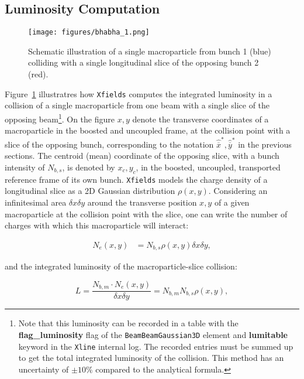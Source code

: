 \subsection{Luminosity Computation} 

\begin{figure}[h]
	\centering
	\texttt{[image: figures/bhabha\_1.png]}
	\caption{\small Schematic illustration of a single macroparticle from bunch 1 (blue) colliding with a single longitudinal slice of the opposing bunch 2 (red).  \label{fig:bhabha_1}}
\end{figure}

Figure~\ref{fig:bhabha_1} illustratres how \texttt{Xfields} computes the integrated luminosity in a collision of a single macroparticle from one beam with a single slice of the opposing beam\footnote{Note that this luminosity can be recorded in a table with the \textbf{flag\_luminosity} flag of the \texttt{BeamBeamGaussian3D} element and \textbf{lumitable} keyword in the \texttt{Xline} internal log. The recorded entries must be summed up to get the total integrated luminosity of the collision. This method has an uncertainty of $\pm10\%$ compared to the analytical formula.}. On the figure $x,y$ denote the transverse coordinates of a macroparticle in the boosted and uncoupled frame, at the collision point with a slice of the opposing bunch, corresponding to the notation $\hat{\overline{x}}^*, \hat{\overline{y}}^* $ in the previous sections. The centroid (mean) coordinate of the opposing slice, with a bunch intensity of $N_{b,s}$, is denoted by $x_c,y_c$, in the boosted, uncoupled, transported reference frame of its own bunch. \texttt{Xfields} models the charge density of a longitudinal slice as a 2D Gaussian distribution $\rho(x,y)$. Considering an infinitesimal area $\delta x \delta y$ around the transverse position $x,y$ of a given macroparticle at the collision point with the slice, one can write the number of charges with which this macroparticle will interact:

\begin{equation}
	\begin{split}
		N_e(x,y) & = N_{b,s} \rho(x,y) \delta x \delta y,
	\end{split}
	\label{eq:bhabha_1}
\end{equation}

and the integrated luminosity of the macroparticle-slice collision:

\begin{equation}
	L = \frac{N_{b,m}\cdot N_e(x,y)}{\delta x \delta y} = N_{b,m} N_{b,s} \rho(x,y),
	\label{eq:bhabha_2}
\end{equation}


